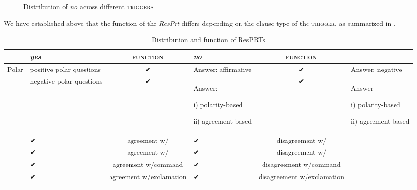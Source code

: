 \documentclass[output=paper]{LSP/langsci}
\begin{document}
\begin{figure}
\caption{Distribution of \textit{no} across different \textsc{triggers}}
\label{fig:wiltschko:no}
\end{figure}

We have established above that the function of the \textit{ResPrt} differs depending on the clause type of the \textsc{trigger}, as summarized in .

\begin{table}
\begin{tabularx}{\textwidth}{lQcQcQ}
\lsptoprule
{} & \textit{yes} & \textsc{function} & \textit{no} & \textsc{function}\\
\midrule
Polar  & positive polar questions & ✔ & Answer: affirmative & ✔ & Answer: negative\\
& negative polar questions & ✔ & Answer:

i) polarity-based

ii) agreement-based & ✔ & Answer

i) polarity-based

ii) agreement-based\\
\tablevspace
{} & ✔ & agreement w/ & ✔ & disagreement w/\\
\tablevspace
{} & ✔ & agreement w/ & ✔ & disagreement w/\\
\tablevspace
{} & ✔ & agreement w/command & ✔ & disagreement w/command\\
\tablevspace
{} & ✔ & agreement w/exclamation & ✔ & disagreement w/exclamation\\
\lspbottomrule
\end{tabularx}
\caption{Distribution and function of ResPRTs\label{tab:wil:ResPRTs}}

\end{table}
\end{document}

